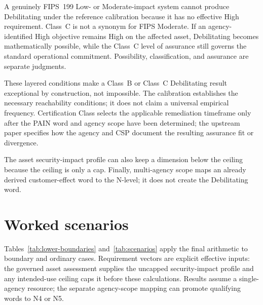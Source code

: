 \documentclass[11pt]{article}
\begin{document}
\begin{plain}
A genuinely FIPS~199 Low- or Moderate-impact system cannot produce Debilitating
under the reference calibration because it has no effective High requirement.
Class~C is not a synonym for FIPS Moderate. If an agency-identified High objective
remains High on the affected asset, Debilitating becomes mathematically possible,
while the Class~C level of assurance still governs the standard operational
commitment. Possibility, classification, and assurance are separate judgments.
\end{plain}

These layered conditions make a Class~B or Class~C Debilitating result exceptional
by construction, not impossible. The calibration establishes the necessary
reachability conditions; it does not claim a universal empirical frequency.
Certification Class selects the applicable remediation timeframe only after the
PAIN word and agency scope have been determined; the upstream paper specifies how
the agency and CSP document the resulting assurance fit or divergence.

The asset security-impact profile can also keep a dimension below the ceiling
because the ceiling is only a cap. Finally, multi-agency scope maps an already
derived customer-effect word to the N-level; it does not create the Debilitating
word.

\section{Worked scenarios}
\label{sec:scenarios}

Tables~\ref{tab:lower-boundaries} and~\ref{tab:scenarios} apply the final arithmetic
to boundary and ordinary cases. Requirement vectors are explicit effective inputs:
the governed asset assessment supplies the uncapped security-impact profile and any
intended-use ceiling caps it before these calculations. Results assume a
single-agency resource; the separate agency-scope mapping can promote qualifying
words to N4 or N5.
\end{document}
